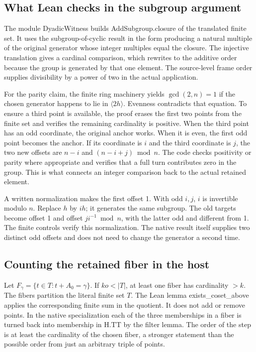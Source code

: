 \documentclass[12pt,letterpaper]{article}
\DeclareRobustCommand{\id}[1]{\mbox{\small\ttfamily #1}}
\begin{document}
\subsection{What Lean checks in the subgroup argument}

The module \id{DyadicWitness} builds \id{AddSubgroup.closure} of the translated finite set. It uses the subgroup-of-cyclic result in the form producing a natural multiple of the original generator whose integer multiples equal the closure. The injective translation gives a cardinal comparison, which rewrites to the additive order because the group is generated by that one element. The source-level frame order supplies divisibility by a power of two in the actual application.

For the parity claim, the finite ring machinery yields \(\gcd(2,n)=1\) if the chosen generator happens to lie in \(\langle2h\rangle\). Evenness contradicts that equation. To ensure a third point is available, the proof erases the first two points from the finite set and verifies the remaining cardinality is positive. When the third point has an odd coordinate, the original anchor works. When it is even, the first odd point becomes the anchor. If its coordinate is \(i\) and the third coordinate is \(j\), the two new offsets are \(n-i\) and \((n-i+j)\bmod n\). The code checks positivity or parity where appropriate and verifies that a full turn contributes zero in the group. This is what connects an integer comparison back to the actual retained element.

A written normalization makes the first offset 1. With odd \(i,j\), \(i\) is invertible modulo \(n\). Replace \(h\) by \(ih\); it generates the same subgroup. The old targets become offset 1 and offset \(ji^{-1}\bmod n\), with the latter odd and different from 1. The finite controls verify this normalization. The native result itself supplies two distinct odd offsets and does not need to change the generator a second time.

\subsection{Counting the retained fiber in the host}

Let \(F_\gamma=\{t\in T:t+A_0=\gamma\}\). If \(ko<|T|\), at least one fiber has cardinality \(>k\). The fibers partition the literal finite set \(T\). The Lean lemma \id{exists\_coset\_above} applies the corresponding finite sum in the quotient. It does not add or remove points. In the native specialization each of the three memberships in a fiber is turned back into membership in \id{H.TT} by the filter lemma. The order of the step is at least the cardinality of the chosen fiber, a stronger statement than the possible order from just an arbitrary triple of points.
\end{document}
